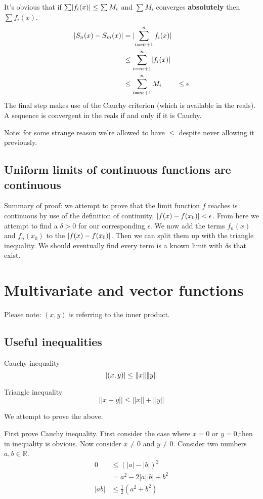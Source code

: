 \documentclass{article}
\DeclarePairedDelimiter{\abs}{\lvert}{\rvert}
\DeclarePairedDelimiter\norm{\lVert}{\rVert}
\begin{document}
It's obvious that if $\sum \abs{f_i(x)} \leq \sum M_i$ and $\sum M_i$ converges
\textbf{absolutely} then $\sum f_i(x)$.
\begin{align*}
    \abs{S_n(x) - S_m(x)} &= \abs{\sum_{i=m+1}^n f_i(x)} \\
    &\leq \sum_{i=m+1}^n \abs{f_i(x)} \\
    &\leq \sum_{i=m+1}^n M_i
    &\leq \epsilon
\end{align*}
The final step makes use of the Cauchy criterion (which is available in the
reals). A sequence is convergent in the reals if and only if it is Cauchy.

Note: for some strange reason we're allowed to have $\leq$ despite never
allowing it previously.

\subsection{Uniform limits of continuous functions are continuous}
Summary of proof: we attempt to prove that the limit function $f$ reaches
is continuous by use of the definition of continuity,
$\abs*{f(x) - f(x_0)} < \epsilon$. From here we attempt to find a $\delta > 0$
for our corresponding $\epsilon$. We now add the terms $f_n(x)$ and $f_n(x_0)$
to the $\abs*{f(x) - f(x_0)}$. Then we can split them up with the triangle
inequality. We should eventually find every term is a known limit with
$\delta$s that exist.

\section{Multivariate and vector functions}
Please note: $(x,y)$ is referring to the inner product.
\subsection{Useful inequalities}
Cauchy inequality
\[
    \abs*{(x,y)} \leq \norm{x} \norm{y}
\]

Triangle inequality
\[
    ||x + y|| \leq ||x|| + ||y||
\]

We attempt to prove the above.

First prove Cauchy inequality.
First consider the case where $x=0$ or $y=0$,then in inequality is obvious.
Now consider $x\neq0$ and $y\neq0$. Consider two numbers $a,b \in \mathbb{R}$.
\begin{align*}
    0 &\leq {(|a| - |b|)}^2 \\
    &= a^2 - 2|a||b| + b^2 \\
    |ab| &\leq \frac{1}{2} (a^2 + b^2) \\
\end{align*}
\end{document}
